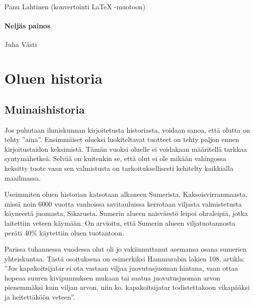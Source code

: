 \documentclass[a4paper,11pt]{report}
\begin{document}
Panu Lahtinen (konvertointi LaTeX -muotoon)

\subsubsection*{Neljäs painos}

Juha Västi

\chapter{Oluen historia}



\section{Muinaishistoria}

Jos puhutaan ihmiskunnan kirjoitetusta historiasta, voidaan sanoa, että olutta on tehty ''aina''. Ensimmäiset olueksi luokiteltavat tuotteet on tehty paljon ennen kirjoitustaidon keksimistä. Tämän vuoksi oluelle ei voidakaan määritellä tarkkaa syntymähetkeä. Selvää on kuitenkin se, että olut ei ole mikään vahingossa keksitty tuote vaan sen valmistusta on tarkoituksellisesti kehitelty kaikkialla maailmassa.

Useimmiten oluen historian katsotaan alkaneen Sumerista, Kaksoisvirranmaasta, missä noin 6000 vuotta vanhoissa savitauluissa kerrotaan viljasta valmistetusta käyneestä juomasta, Sikarusta. Sumerin alueen naisväestö leipoi ohraleipiä, jotka laitettiin veteen käymään. On arvioitu, että Sumerin alueen viljatuotannosta peräti 40\% käytettiin oluen tuotantoon.

Parissa tuhannessa vuodessa olut oli jo vakiinnuttanut asemansa osana sumerien yhteiskuntaa. Tästä osoituksena on esimerkiksi Hammurabin lakien 108. artikla: ''Jos kapakoitsijatar ei ota vastaan viljaa juovutusjuoman hintana, vaan ottaa hopeaa suuren kivipunnuksen mukaan tai saatua juovutusjuoman arvon pienemmäksi kuin viljan arvon, niin ko. kapakoitsijatar todistettakoon vikapääksi ja heitettäköön veteen''.
\end{document}
